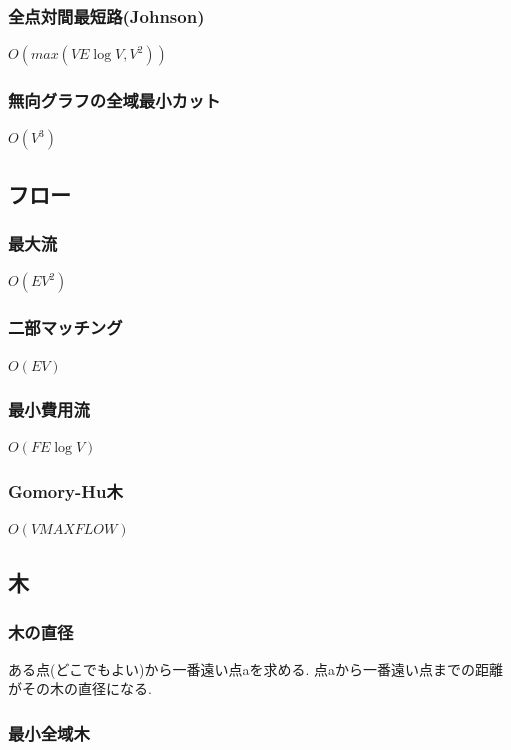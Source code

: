 \documentclass[9pt,twocolumn,a4paper,landscape]{extarticle}
\begin{document}
\subsubsection{全点対間最短路(Johnson)}
$O(max(VE\log V, V^2))$

\subsubsection{無向グラフの全域最小カット}
$O(V^3)$


\subsection{フロー}
\subsubsection{最大流}
$O(EV^2)$\par


\subsubsection{二部マッチング}
$O(EV)$\par


\subsubsection{最小費用流}
$O(FE\log V)$\par


\subsubsection{Gomory-Hu木}
$O(V MAXFLOW)$


\subsection{木}
\subsubsection{木の直径}
ある点(どこでもよい)から一番遠い点aを求める. 点aから一番遠い点までの距離がその木の直径になる.\par
\subsubsection{最小全域木}

\end{document}

